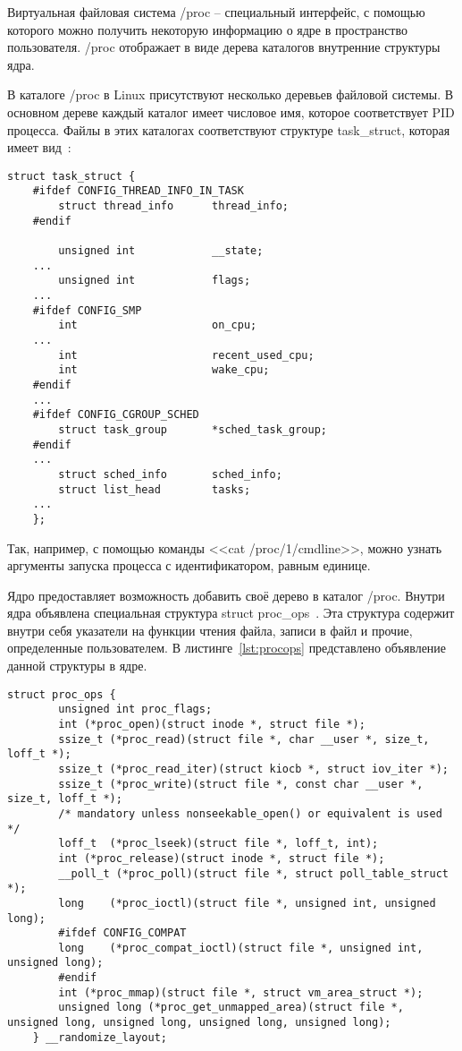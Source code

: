 Виртуальная файловая система /proc -- специальный интерфейс, с помощью которого можно получить некоторую информацию о ядре в пространство пользователя. /proc отображает в виде дерева каталогов внутренние структуры ядра.

В каталоге /proc в Linux присутствуют несколько деревьев файловой системы. В основном дереве каждый каталог имеет числовое имя, которое соответствует PID процесса. Файлы в этих каталогах соответствуют структуре task\_struct, которая имеет вид~\cite{task_struct}:

\begin{lstlisting}[caption={структура task\_struct с наиболее важными полями}]
	struct task_struct {
	#ifdef CONFIG_THREAD_INFO_IN_TASK
		struct thread_info		thread_info;
	#endif
		
		unsigned int			__state;
	...
		unsigned int			flags;
	...
	#ifdef CONFIG_SMP
		int						on_cpu;
	...
		int						recent_used_cpu;
		int						wake_cpu;
	#endif
	...
	#ifdef CONFIG_CGROUP_SCHED
		struct task_group		*sched_task_group;
	#endif
	...
		struct sched_info		sched_info;
		struct list_head		tasks;
	...
	};
\end{lstlisting}

Так, например, с помощью команды <<cat /proc/1/cmdline>>, можно узнать аргументы запуска процесса с идентификатором, равным единице.

Ядро предоставляет возможность добавить своё дерево в каталог /proc. Внутри ядра объявлена специальная структура struct proc\_ops~\cite{proc_ops}. Эта структура содержит внутри себя указатели на функции чтения файла, записи в файл и прочие, определенные пользователем. В листинге~\ref{lst:procops} представлено объявление данной структуры в ядре.

\begin{lstlisting}[label={lst:procops}, caption={структура struct proc\_ops}]
	struct proc_ops {
		unsigned int proc_flags;
		int	(*proc_open)(struct inode *, struct file *);
		ssize_t	(*proc_read)(struct file *, char __user *, size_t, loff_t *);
		ssize_t (*proc_read_iter)(struct kiocb *, struct iov_iter *);
		ssize_t	(*proc_write)(struct file *, const char __user *, size_t, loff_t *);
		/* mandatory unless nonseekable_open() or equivalent is used */
		loff_t	(*proc_lseek)(struct file *, loff_t, int);
		int	(*proc_release)(struct inode *, struct file *);
		__poll_t (*proc_poll)(struct file *, struct poll_table_struct *);
		long	(*proc_ioctl)(struct file *, unsigned int, unsigned long);
		#ifdef CONFIG_COMPAT
		long	(*proc_compat_ioctl)(struct file *, unsigned int, unsigned long);
		#endif
		int	(*proc_mmap)(struct file *, struct vm_area_struct *);
		unsigned long (*proc_get_unmapped_area)(struct file *, unsigned long, unsigned long, unsigned long, unsigned long);
	} __randomize_layout;
\end{lstlisting}

